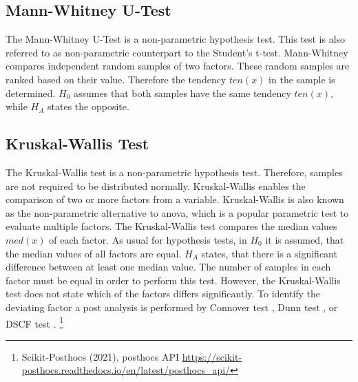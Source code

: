 \subsection{Mann-Whitney U-Test}\label{ord:ch2:sec4:subsec3}

The Mann-Whitney U-Test \cite{MW47-MannWhitneyTest} is a non-parametric hypothesis test.
This test is also referred to as non-parametric counterpart to the Student's t-test.
Mann-Whitney compares independent random samples of two factors.
These random samples are ranked based on their value.
Therefore the tendency $ten \left( x \right) $ in the sample is determined.
$H_{0}$ assumes that both samples have the same tendency $ten \left( x \right) $, while $H_{A}$ states the opposite.


\subsection{Kruskal-Wallis Test}\label{ord:ch2:sec4:subsec4}
The Kruskal-Wallis test \cite{KW53-KruskalWallisTest} is a non-parametric hypothesis test.
Therefore, samples are not required to be distributed normally.
Kruskal-Wallis enables the comparison of two or more factors from a variable.
Kruskal-Wallis is also known as the non-parametric alternative to \gls{anova}, which is a popular parametric test to evaluate multiple factors.
The Kruskal-Wallis test compares the median values $med \left( x \right) $ of each factor.
As usual for hypothesis tests, in $H_{0}$ it is assumed, that the median values of all factors are equal.
$H_{A}$ states, that there is a significant difference between at least one median value.
The number of samples in each factor must be equal in order to perform this test.
However, the Kruskal-Wallis test does not state which of the factors differs significantly.
To identify the deviating factor a post analysis is performed by \eg Connover test \cite{CI79-ConnocerTest}, Dunn test \cite{Dunn64-DunnTest}, or DSCF test \cite{CF91-dscf}. \footnote{Scikit-Posthocs (2021), posthocs API \url{https://scikit-posthocs.readthedocs.io/en/latest/posthocs_api/}} 

